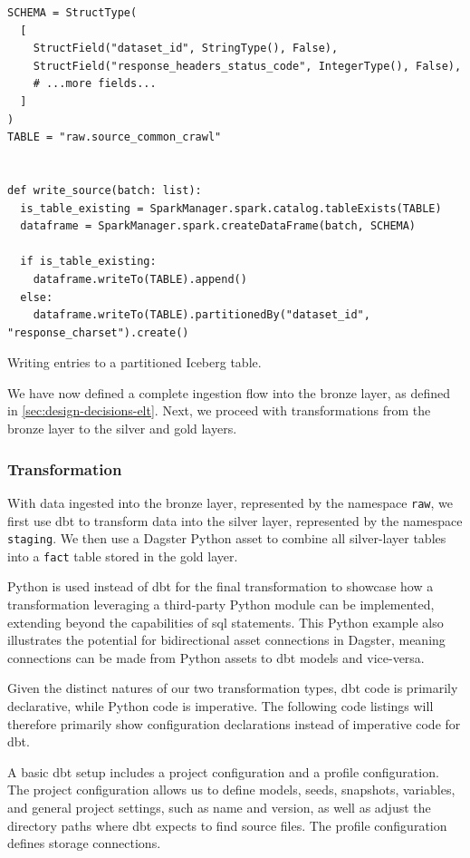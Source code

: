 \begin{listing}[H]
\begin{verbatim}
SCHEMA = StructType(
  [
    StructField("dataset_id", StringType(), False),
    StructField("response_headers_status_code", IntegerType(), False),
    # ...more fields...
  ]
)
TABLE = "raw.source_common_crawl"


def write_source(batch: list):
  is_table_existing = SparkManager.spark.catalog.tableExists(TABLE)
  dataframe = SparkManager.spark.createDataFrame(batch, SCHEMA)

  if is_table_existing:
    dataframe.writeTo(TABLE).append()
  else:
    dataframe.writeTo(TABLE).partitionedBy("dataset_id", "response_charset").create()
\end{verbatim}
\caption{Writing entries to a partitioned Iceberg table.}
\label{lst:dagster-source-common-crawl-write}
\end{listing}

We have now defined a complete ingestion flow into the bronze layer, as defined in \cref{sec:design-decisions-elt}.
Next, we proceed with transformations from the bronze layer to the silver and gold layers.


\subsubsection{Transformation}
\label{sec:implementation-pipeline-transformation}

With data ingested into the bronze layer, represented by the namespace \texttt{raw}, we first use dbt to transform data into the silver layer, represented by the namespace \texttt{staging}.
We then use a Dagster Python asset to combine all silver-layer tables into a \texttt{fact} table stored in the gold layer.

Python is used instead of dbt for the final transformation to showcase how a transformation leveraging a third-party Python module can be implemented, extending beyond the capabilities of \ac{sql} statements.
This Python example also illustrates the potential for bidirectional asset connections in Dagster, meaning connections can be made from Python assets to dbt models and vice-versa.

Given the distinct natures of our two transformation types, dbt code is primarily declarative, while Python code is imperative.
The following code listings will therefore primarily show configuration declarations instead of imperative code for dbt.

A basic dbt setup includes a project configuration and a profile configuration.
The project configuration allows us to define models, seeds, snapshots, variables, and general project settings, such as name and version, as well as adjust the directory paths where dbt expects to find source files.
The profile configuration defines storage connections.

